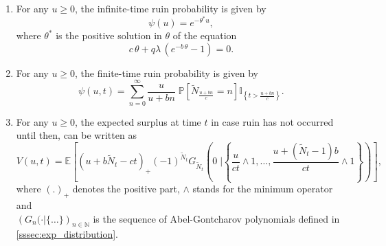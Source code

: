 \begin{prop}\label{prop:ruin_proba_and_value_func} 

\begin{enumerate}
\item For any $u\ge 0$, the infinite-time ruin probability is given by
\begin{equation}\label{eq:infinite_time_ruin_proba}
\psi(u) =e^{-\theta^\ast u},
\end{equation}
where $\theta^\ast$ is the positive solution in $\theta$ of the equation 
\begin{equation}\label{eq:cl_equation}
{c}\,\theta + q\lambda \, (e^{-b\, \theta }-1)=0.
\end{equation}
\item For any $u\ge 0$, the finite-time ruin probability is given by 
\begin{equation}\label{eq:finite_time_ruin_proba}
\psi(u,t) = \sum_{n = 0}^{\infty}\frac{u}{u+bn}\;\mathbb{P}\left[\tilde{N}_{\frac{u+bn}{c}} = n\right]\mathbb{I}_{\left\{t>\frac{u+bn}{c}\right\}}. 
\end{equation}
\item For any $u\ge 0$, the expected surplus at time $t$ in case ruin has not occurred until then, can be written as 
\begin{equation}\label{eq:value_function_finite_time_prop}
V(u,t) = \mathbb{E}\left[\left(u+b\tilde{N}_t - ct\right)_+(-1)^{\tilde{N}_t}G_{\tilde{N}_t}\left(0\;\Big\rvert \left\{\frac{u}{ct}\land 1,\ldots, \frac{u+(\tilde{N}_t-1)b}{ct}\land 1\right\}\right) \right],
\end{equation}
where $(.)_+$ denotes the positive part, $\land$ stands for the minimum operator and\\ $\left(G_n(\cdot\rvert\{\ldots\}\right)_{n\in\mathbb{N}}$ is the sequence of Abel-Gontcharov polynomials defined in \cref{sssec:exp_distribution}. 
\end{enumerate}
\end{prop}
